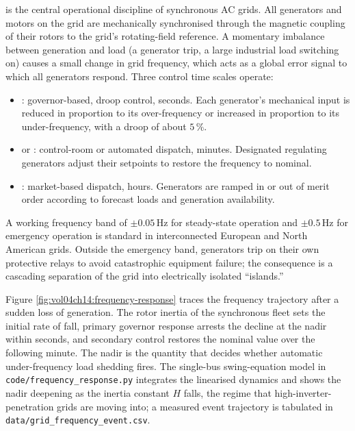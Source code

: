  is the central operational discipline
of synchronous AC grids. All generators and motors on the grid are
mechanically synchronised through the magnetic coupling of their
rotors to the grid's rotating-field reference. A momentary imbalance
between generation and load (a generator trip, a large industrial
load switching on) causes a small change in grid frequency, which
acts as a global error signal to which all generators respond. Three
control time scales operate:
\begin{itemize}[leftmargin=*]
  \item {}: governor-based, droop
    control, seconds. Each generator's mechanical input is reduced
    in proportion to its over-frequency or increased in proportion to
    its under-frequency, with a droop of about $5\,\%$.
  \item {} or
    : control-room or
    automated dispatch, minutes. Designated regulating generators
    adjust their setpoints to restore the frequency to nominal.
  \item {}: market-based dispatch, hours.
    Generators are ramped in or out of merit order according to
    forecast loads and generation availability.
\end{itemize}

A working frequency band of $\pm 0.05\,\si{\hertz}$ for steady-state
operation and $\pm 0.5\,\si{\hertz}$ for emergency operation is
standard in interconnected European and North American grids. Outside
the emergency band, generators trip on their own protective relays
to avoid catastrophic equipment failure; the consequence is a
cascading separation of the grid into electrically isolated
``islands.''



Figure \ref{fig:vol04ch14:frequency-response} traces the frequency
trajectory after a sudden loss of generation. The rotor inertia of the
synchronous fleet sets the initial rate of fall, primary governor
response arrests the decline at the nadir within seconds, and secondary
control restores the nominal value over the following minute. The
nadir is the quantity that decides whether automatic under-frequency
load shedding fires. The single-bus swing-equation model in
\texttt{code/frequency\_response.py} integrates the linearised dynamics
and shows the nadir deepening as the inertia constant $H$ falls, the
regime that high-inverter-penetration grids are moving into; a measured
event trajectory is tabulated in \texttt{data/grid\_frequency\_event.csv}.

